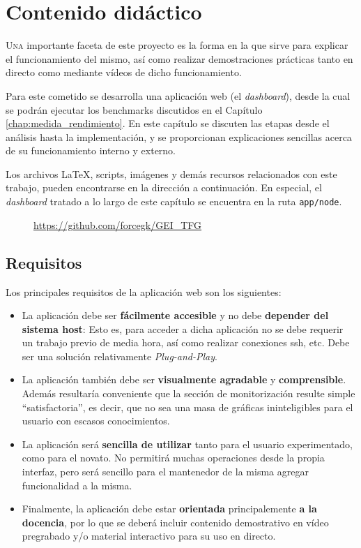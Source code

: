 \chapter{Contenido didáctico}
\label{chap:contenido_didactico}

\lettrine{U}{na} importante faceta de este proyecto es la forma en la que sirve para explicar el funcionamiento del mismo, así como realizar demostraciones prácticas tanto en directo como mediante vídeos de dicho funcionamiento.

Para este cometido se desarrolla una aplicación web (el \textit{dashboard}), desde la cual se podrán ejecutar los benchmarks discutidos en el Capítulo \ref{chap:medida_rendimiento}. En este capítulo se discuten las etapas desde el análisis hasta la implementación, y se proporcionan explicaciones sencillas acerca de su funcionamiento interno y externo.

Los archivos \LaTeX, scripts, imágenes y demás recursos relacionados con este trabajo, pueden encontrarse en la dirección a continuación. En especial, el \textit{dashboard} tratado a lo largo de este capítulo se encuentra en la ruta \texttt{app/node}. 

\begin{figure}[H]
    \vspace{0.2cm}
    \centering
    \url{https://github.com/forcegk/GEI_TFG}
\end{figure}

\section{Requisitos}
Los principales requisitos de la aplicación web son los siguientes:

\begin{itemize}
    \item La aplicación debe ser \textbf{fácilmente accesible} y no debe \textbf{depender del sistema host}: Esto es, para acceder a dicha aplicación no se debe requerir un trabajo previo de media hora, así como realizar conexiones \acrshort{ssh}, etc. Debe ser una solución relativamente \textit{Plug-and-Play}.
    \item La aplicación también debe ser \textbf{visualmente agradable} y \textbf{comprensible}. Además resultaría conveniente que la sección de monitorización resulte simple ``satisfactoria'', es decir, que no sea una masa de gráficas ininteligibles para el usuario con escasos conocimientos.
    \item La aplicación será \textbf{sencilla de utilizar} tanto para el usuario experimentado, como para el novato. No permitirá muchas operaciones desde la propia interfaz, pero será sencillo para el mantenedor de la misma agregar funcionalidad a la misma.
    \item Finalmente, la aplicación debe estar \textbf{orientada} principalemente \textbf{a la docencia}, por lo que se deberá incluir contenido demostrativo en vídeo pregrabado y/o material interactivo para su uso en directo.
\end{itemize}

